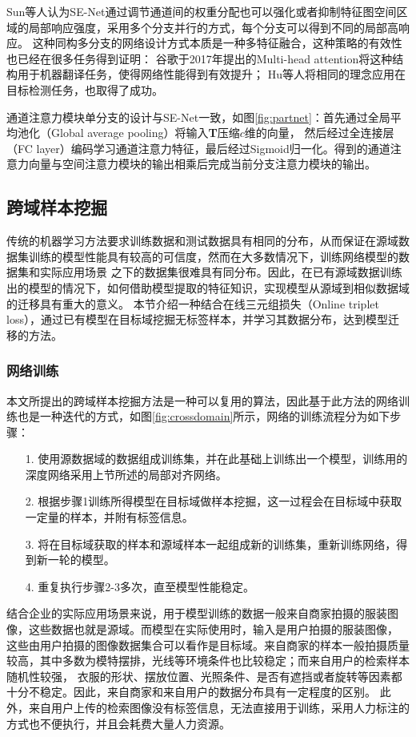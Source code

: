 Sun等人认为SE-Net通过调节通道间的权重分配也可以强化或者抑制特征图空间区域的局部响应强度，采用多个分支并行的方式，每个分支可以得到不同的局部高响应\cite{sun2018multi}。
这种同构多分支的网络设计方式本质是一种多特征融合，这种策略的有效性也已经在很多任务得到证明：
谷歌于2017年提出的Multi-head attention\cite{vaswani2017attention}将这种结构用于机器翻译任务，使得网络性能得到有效提升；
Hu等人将相同的理念应用在目标检测任务\cite{hu2018relation}，也取得了成功。

通道注意力模块单分支的设计与SE-Net一致，如图\ref{fig:partnet}：首先通过全局平均池化（Global average pooling）将输入\textbf{T}压缩$c$维的向量，
然后经过全连接层（FC layer）编码学习通道注意力特征，最后经过Sigmoid归一化。得到的通道注意力向量与空间注意力模块的输出相乘后完成当前分支注意力模块的输出。

\subsection{跨域样本挖掘}
传统的机器学习方法要求训练数据和测试数据具有相同的分布，从而保证在源域数据集训练的模型性能具有较高的可信度，然而在大多数情况下，训练网络模型的数据集和实际应用场景
之下的数据集很难具有同分布。因此，在已有源域数据训练出的模型的情况下，如何借助模型提取的特征知识，实现模型从源域到相似数据域的迁移具有重大的意义。
本节介绍一种结合在线三元组损失（Online triplet loss），通过已有模型在目标域挖掘无标签样本，并学习其数据分布，达到模型迁移的方法。

\subsubsection{网络训练}

本文所提出的跨域样本挖掘方法是一种可以复用的算法，因此基于此方法的网络训练也是一种迭代的方式，如图\ref{fig:crossdomain}所示，网络的训练流程分为如下步骤：
\begin{itemize}
  \item[1.] 使用源数据域的数据组成训练集，并在此基础上训练出一个模型，训练用的深度网络采用上节所述的局部对齐网络。
  \item[2.] 根据步骤1训练所得模型在目标域做样本挖掘，这一过程会在目标域中获取一定量的样本，并附有标签信息。
  \item[3.] 将在目标域获取的样本和源域样本一起组成新的训练集，重新训练网络，得到新一轮的模型。
  \item[4.] 重复执行步骤2-3多次，直至模型性能稳定。
\end{itemize}

结合企业的实际应用场景来说，用于模型训练的数据一般来自商家拍摄的服装图像，这些数据也就是源域。而模型在实际使用时，输入是用户拍摄的服装图像，
这些由用户拍摄的图像数据集合可以看作是目标域。来自商家的样本一般拍摄质量较高，其中多数为模特摆排，光线等环境条件也比较稳定；而来自用户的检索样本随机性较强，
衣服的形状、摆放位置、光照条件、是否有遮挡或者旋转等因素都十分不稳定。因此，来自商家和来自用户的数据分布具有一定程度的区别。
此外，来自用户上传的检索图像没有标签信息，无法直接用于训练，采用人力标注的方式也不便执行，并且会耗费大量人力资源。

